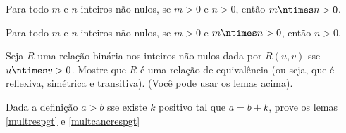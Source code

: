 \begin{definition}
	\label{multrespgt}
	Para todo $m$ e $n$ inteiros não-nulos, se $m > 0$ e $n > 0$, então $m \ntimes n > 0$.
\end{definition}

\begin{definition}
	\label{multcancrespgt}
	Para todo $m$ e $n$ inteiros não-nulos, se $m > 0$ e $m \ntimes n > 0$, então $n > 0$.
\end{definition}

\begin{exercise}
Seja $R$ uma relação binária nos inteiros não-nulos dada por $R(u, v)$ sse $u \ntimes v > 0$.
Mostre que $R$ é uma relação de equivalência (ou seja, que é reflexiva, simétrica e transitiva).
(Você pode usar os lemas acima).
\end{exercise}

\begin{homework}
Dada a definição $a > b$ sse existe $k$ positivo tal que $a = b + k$, prove os lemas \ref{multrespgt} e \ref{multcancrespgt}
\end{homework}
